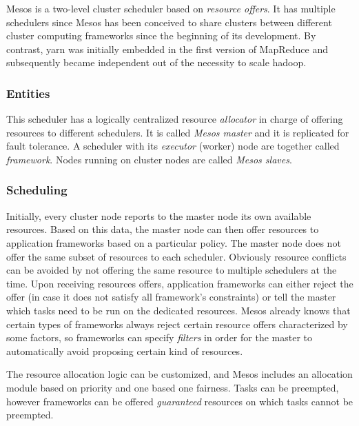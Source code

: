 Mesos \cite{mesos} is a two-level cluster scheduler based on \textit{resource offers}.
It has multiple schedulers since Mesos \cite{mesos} has been conceived to share clusters between different cluster computing frameworks since the beginning of its development.
By contrast, \glsdesc{yarn} was initially embedded in the first version of MapReduce \cite{mapreduce} and subsequently became independent out of the necessity to scale \glsdesc{hadoop}.

\subsubsection{Entities}
This scheduler has a logically centralized resource \textit{allocator} in charge of offering resources to different schedulers.
It is called \textit{Mesos master} and it is replicated for fault tolerance.
A scheduler with its \textit{executor} (worker) node are together called \textit{framework}.
Nodes running on cluster nodes are called \textit{Mesos slaves}.

\subsubsection{Scheduling}
Initially, every cluster node reports to the master node its own available resources.
Based on this data, the master node can then offer resources to application frameworks based on a particular policy.
The master node does not offer the same subset of resources to each scheduler.
Obviously resource conflicts can be avoided by not offering the same resource to multiple schedulers at the time.
Upon receiving resources offers, application frameworks can either reject the offer (in case it does not satisfy all framework's constraints) or tell the master which tasks need to be run on the dedicated resources.
Mesos \cite{mesos} already knows that certain types of frameworks always reject certain resource offers characterized by some factors, so frameworks can specify \textit{filters} in order for the master to automatically avoid proposing certain kind of resources.\par
The resource allocation logic can be customized, and Mesos \cite{mesos} includes an allocation module based on priority and one based one fairness.
Tasks can be preempted, however frameworks can be offered \textit{guaranteed} resources on which tasks cannot be preempted.


